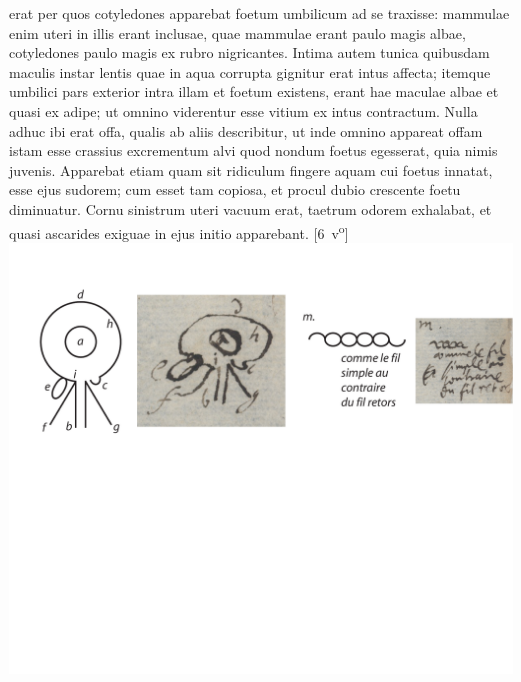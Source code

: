  erat 
per quos cotyledones apparebat foetum umbilicum ad se traxisse: mammulae enim uteri in illis erant inclusae, quae mammulae erant paulo magis albae, cotyledones paulo magis ex rubro nigricantes. Intima autem tunica quibusdam maculis instar lentis quae in aqua corrupta gignitur erat intus affecta; itemque umbilici pars exterior intra illam et foetum
\pend
\newpage
\pstart\noindent existens, erant hae maculae albae et quasi ex adipe; ut omnino viderentur esse vitium ex 
intus  contractum.
Nulla adhuc ibi erat offa, qualis ab aliis describitur, ut inde omnino appareat offam istam esse crassius excrementum alvi quod nondum foetus egesserat, quia nimis juvenis.
\pend%
\pstart%
Apparebat etiam quam sit ridiculum fingere aquam cui foetus innatat, esse ejus sudorem; cum esset tam copiosa, et procul dubio crescente foetu diminuatur. Cornu sinistrum uteri vacuum erat, taetrum odorem exhalabat, et quasi ascarides exiguae in ejus initio apparebant.
[6~v\textsuperscript{o}]
\pend%
\vspace{1em}%
\pstart%
\centering%
\noindent%
\includegraphics[trim = 0mm 2mm 0mm 0mm, clip, width=1\textwidth]{images/lh0040104b_006r1.pdf}\\
\pend%
\vspace{1em}

